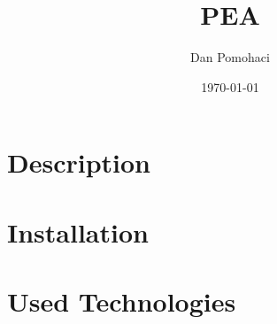 \documentclass[12pt,a4paper]{article}
\author{Dan Pomohaci}
\date{\today}
\title{PEA}
\begin{document}
\maketitle
\tableofcontents


\section{Description}
\label{sec:orgheadline1}

\section{Installation}
\label{sec:orgheadline2}

\section{Used Technologies}
\label{sec:orgheadline3}
\end{document}

